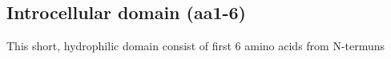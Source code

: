 \subsection{Introcellular domain (aa1-6)}

This short, hydrophilic domain consist of first 6 amino acids from N-termuns